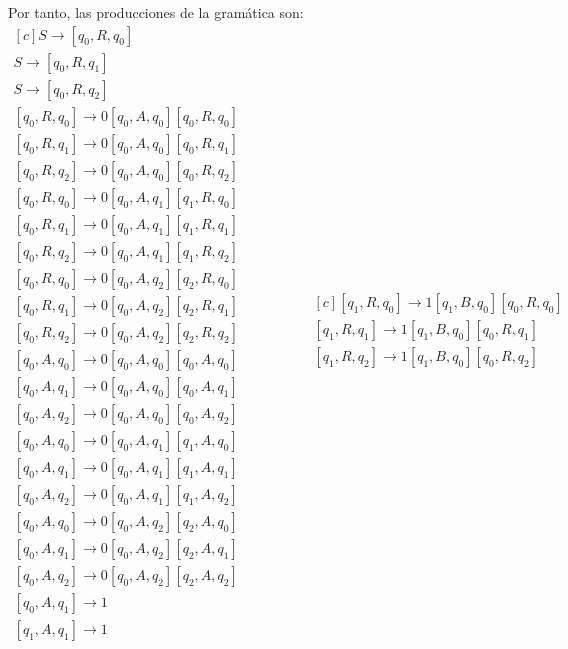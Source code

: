 \documentclass[11pt,a4paper]{article}
\begin{document}
Por tanto, las producciones de la gramática son:
	\begin{equation*}
	\begin{aligned}[c]
	  S\rightarrow [q_0,R,q_0] \qquad \qquad \qquad \qquad \\
	  S\rightarrow [q_0,R,q_1] \qquad \qquad \qquad \qquad \\
	  S\rightarrow [q_0,R,q_2] \qquad \qquad \qquad \qquad \\
	  [q_0,R,q_0]\rightarrow 0[q_0,A,q_0][q_0,R,q_0]\\
	  [q_0,R,q_1]\rightarrow 0[q_0,A,q_0][q_0,R,q_1]\\
	  [q_0,R,q_2]\rightarrow 0[q_0,A,q_0][q_0,R,q_2]\\
	  [q_0,R,q_0]\rightarrow 0[q_0,A,q_1][q_1,R,q_0]\\
	  [q_0,R,q_1]\rightarrow 0[q_0,A,q_1][q_1,R,q_1]\\
	  [q_0,R,q_2]\rightarrow 0[q_0,A,q_1][q_1,R,q_2]\\
	  [q_0,R,q_0]\rightarrow 0[q_0,A,q_2][q_2,R,q_0]\\
	  [q_0,R,q_1]\rightarrow 0[q_0,A,q_2][q_2,R,q_1]\\
	  [q_0,R,q_2]\rightarrow 0[q_0,A,q_2][q_2,R,q_2]\\
	  [q_0,A,q_0]\rightarrow 0[q_0,A,q_0][q_0,A,q_0]\\
	  [q_0,A,q_1]\rightarrow 0[q_0,A,q_0][q_0,A,q_1]\\
	  [q_0,A,q_2]\rightarrow 0[q_0,A,q_0][q_0,A,q_2]\\
	  [q_0,A,q_0]\rightarrow 0[q_0,A,q_1][q_1,A,q_0]\\
	  [q_0,A,q_1]\rightarrow 0[q_0,A,q_1][q_1,A,q_1]\\
	  [q_0,A,q_2]\rightarrow 0[q_0,A,q_1][q_1,A,q_2]\\
	  [q_0,A,q_0]\rightarrow 0[q_0,A,q_2][q_2,A,q_0]\\
	  [q_0,A,q_1]\rightarrow 0[q_0,A,q_2][q_2,A,q_1]\\
	  [q_0,A,q_2]\rightarrow 0[q_0,A,q_2][q_2,A,q_2]\\
	  [q_0,A,q_1]\rightarrow 1 \qquad \qquad \qquad \qquad \\
	  [q_1,A,q_1]\rightarrow 1 \qquad \qquad \qquad \qquad
	  \end{aligned}
	  \qquad \qquad
	  \begin{aligned}[c]
	  [q_1,R,q_0]\rightarrow 1[q_1,B,q_0][q_0,R,q_0]\\
	  [q_1,R,q_1]\rightarrow 1[q_1,B,q_0][q_0,R,q_1]\\
	  [q_1,R,q_2]\rightarrow 1[q_1,B,q_0][q_0,R,q_2]\\

\end{aligned}
\end{equation*}
\end{document}
